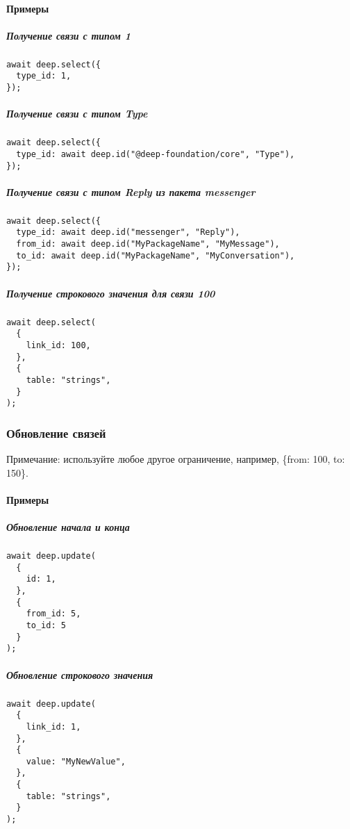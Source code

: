 \documentclass{article}
\begin{document}
\paragraph{Примеры}

\subparagraph{Получение связи с типом 1}
\leavevmode
\begin{lstlisting}
await deep.select({
  type_id: 1,
});
\end{lstlisting}

\subparagraph{Получение связи с типом Type}
\leavevmode
\begin{lstlisting}
await deep.select({
  type_id: await deep.id("@deep-foundation/core", "Type"),
});
\end{lstlisting}

\subparagraph{Получение связи с типом Reply из пакета messenger}
\leavevmode
\begin{lstlisting}
await deep.select({
  type_id: await deep.id("messenger", "Reply"),
  from_id: await deep.id("MyPackageName", "MyMessage"),
  to_id: await deep.id("MyPackageName", "MyConversation"),
});
\end{lstlisting}

\subparagraph{Получение строкового значения для связи 100}
\leavevmode
\begin{lstlisting}
await deep.select(
  {
    link_id: 100,
  },
  {
    table: "strings",
  }
);
\end{lstlisting}

\subsubsection{Обновление связей}

Примечание: используйте любое другое ограничение, например, \{from: 100, to:
150\}.

\paragraph{Примеры}

\subparagraph{Обновление начала и конца}
\leavevmode
\begin{lstlisting}
await deep.update(
  {
    id: 1,
  },
  {
    from_id: 5,
    to_id: 5
  }
);
\end{lstlisting}

\subparagraph{Обновление строкового значения}
\leavevmode
\begin{lstlisting}
await deep.update(
  {
    link_id: 1,
  },
  {
    value: "MyNewValue",
  },
  {
    table: "strings",
  }
);
\end{lstlisting}
\end{document}
